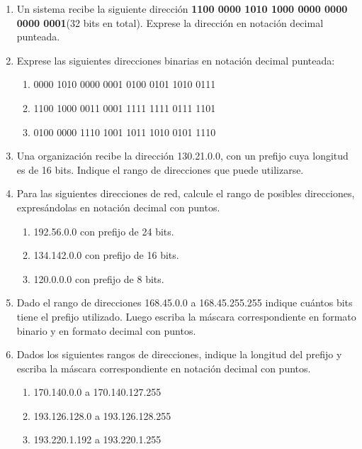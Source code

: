\documentclass[12pt]{article}
\begin{document}
\begin{enumerate}

    \item Un sistema recibe la siguiente dirección \textbf{1100 0000 1010 1000
        0000 0000 0000 0001}(32 bits en total). Exprese la dirección en
        notación decimal punteada. 

    \item Exprese las siguientes direcciones binarias en notación decimal
        punteada: 

    \begin{enumerate}

        \item 0000 1010 0000 0001 0100 0101 1010 0111

        \item 1100 1000 0011 0001 1111 1111 0111 1101

        \item 0100 0000 1110 1001 1011 1010 0101 1110

    \end{enumerate}

    \item Una organización recibe la dirección 130.21.0.0, con un prefijo cuya
        longitud es de 16 bits. Indique el rango de direcciones que puede
        utilizarse. 

    \item Para las siguientes direcciones de red, calcule el rango de posibles
        direcciones, expresándolas en notación decimal con puntos.

    \begin{enumerate}

        \item 192.56.0.0 con prefijo de 24 bits.

        \item 134.142.0.0 con prefijo de 16 bits.

        \item 120.0.0.0 con prefijo de 8 bits.

    \end{enumerate}

    \item Dado el rango de direcciones 168.45.0.0 a 168.45.255.255 indique
        cuántos bits tiene el prefijo utilizado. Luego escriba la máscara
        correspondiente en formato binario y en formato decimal con puntos. 

    \item Dados los siguientes rangos de direcciones, indique la longitud del
        prefijo y escriba la máscara correspondiente en notación decimal con
        puntos.

    \begin{enumerate}

        \item 170.140.0.0 a 170.140.127.255 

        \item 193.126.128.0 a 193.126.128.255 

        \item 193.220.1.192 a 193.220.1.255

    \end{enumerate}

\end{enumerate}
\end{document}
